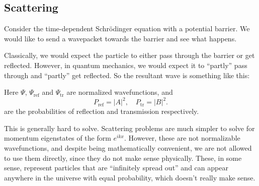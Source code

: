 \documentclass[a4paper]{article}
\begin{document}
\subsection{Scattering}
Consider the time-dependent Schr\"odinger equation with a potential barrier. We would like to send a wavepacket towards the barrier and see what happens.
\begin{center}
\end{center}
Classically, we would expect the particle to either pass through the barrier or get reflected. However, in quantum mechanics, we would expect it to ``partly'' pass through and ``partly'' get reflected. So the resultant wave is something like this:
\begin{center}
\end{center}
Here $\Psi$, $\Psi_{\mathrm{ref}}$ and $\Psi_{\mathrm{tr}}$ are normalized wavefunctions, and
\[
  P_{\mathrm{ref}} = |A|^2,\quad P_{\mathrm{tr}} = |B|^2.
\]
are the probabilities of reflection and transmission respectively.

This is generally hard to solve. Scattering problems are much simpler to solve for momentum eigenstates of the form $e^{ikx}$. However, these are not normalizable wavefunctions, and despite being mathematically convenient, we are not allowed to use them directly, since they do not make sense physically. These, in some sense, represent particles that are ``infinitely spread out'' and can appear anywhere in the universe with equal probability, which doesn't really make sense.
\end{document}
